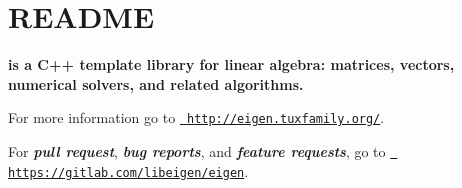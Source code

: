 \chapter{README}
\hypertarget{md_eigen-3_84_80_2eigen-3_84_80_2_r_e_a_d_m_e}{}\label{md_eigen-3_84_80_2eigen-3_84_80_2_r_e_a_d_m_e}
{\bfseries{ is a C++ template library for linear algebra\+: matrices, vectors, numerical solvers, and related algorithms.}}

For more information go to \href{http://eigen.tuxfamily.org/}{\texttt{ http\+://eigen.\+tuxfamily.\+org/}}.

For {\itshape {\bfseries{pull request}}}, {\itshape {\bfseries{bug reports}}}, and {\itshape {\bfseries{feature requests}}}, go to \href{https://gitlab.com/libeigen/eigen}{\texttt{ https\+://gitlab.\+com/libeigen/eigen}}. 